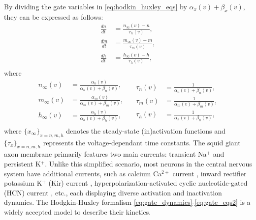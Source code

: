 \documentclass[../main.tex]{subfiles}
\begin{document}
By dividing the gate variables in \eqref{eq:hodkin_huxley_eqs} by $\alpha_x(v) + \beta_x(v)$, they can be expressed as follows:
\begin{equation}
    \begin{aligned}
    \displaystyle\frac{dn}{dt} & = \displaystyle\frac{n_{\infty}(v)-n}{\tau_{n}(v)}, \\
    \displaystyle\frac{dm}{dt} & = \displaystyle\frac{m_{\infty}(v)-m}{\tau_{m}(v)}, \\
    \displaystyle\frac{dh}{dt} & = \displaystyle\frac{h_{\infty}(v)-h}{\tau_{h}(v)}, \\
    \end{aligned}
    \label{eq:gate_dynamics}
\end{equation}
where
\begin{equation}
    \begin{split}
        n_{\infty}(v) &= \displaystyle\frac{\alpha_{n}(v)}{\alpha_{n}(v) + \beta_{n}(v)},\\
        m_{\infty}(v) &= \displaystyle\frac{\alpha_{m}(v)}{\alpha_{m}(v)+ \beta_{m}(v)},\\
        h_{\infty}(v) &= \displaystyle\frac{\alpha_{h}(v)}{\alpha_{h}(v) + \beta_{h}(v)},\\
    \end{split}
    \quad
    \begin{split}
        \tau_{n}(v) &= \displaystyle\frac{1}{\alpha_{n}(v) + \beta_{n}(v)},\\
        \tau_{m}(v) &= \displaystyle\frac{1}{\alpha_{m}(v) + \beta_{m}(v)},\\
        \tau_{h}(v) &= \displaystyle\frac{1}{\alpha_{h}(v) + \beta_{h}(v)},
    \end{split}
	\label{eq:gate_eqs2}
\end{equation}
where $\{x_{\infty}\}_{x=n,m,h}$ denotes the steady-state (in)activation functions and $\{\tau_x\}_{x=n,m,h}$ represents the voltage-dependant time constants.
The squid giant axon membrane primarily features two main currents: transient Na$^{+}$ and persistent K$^{+}$.
Unlike this simplified scenario, most neurons in the central nervous system have additional currents, such as calcium Ca$^{2+}$ current \citep{loewenstein2003temporal}, inward rectifier potassium K$^{+}$ (Kir) current \citep{doi:10.1152/physrev.00021.2009}, hyperpolarization-activated cyclic nucleotide-gated (HCN) current \citep{sartiani2017hyperpolarization}, etc., each displaying diverse activation and inactivation dynamics.
The Hodgkin-Huxley formalism \eqref{eq:gate_dynamics}-\eqref{eq:gate_eqs2} is a widely accepted model to describe their kinetics.
\end{document}
